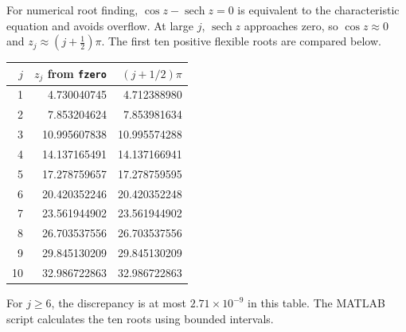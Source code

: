 For numerical root finding, $\cos z-\operatorname{sech}z=0$ is equivalent to the characteristic equation and avoids overflow. At large $j$, $\operatorname{sech}z$ approaches zero, so $\cos z\approx0$ and $z_j\approx(j+\tfrac12)\pi$. The first ten positive flexible roots are compared below.
\begin{center}
\begin{tabular}{rrr}\toprule
$j$ & $z_j$ from \texttt{fzero} & $(j+1/2)\pi$\\\midrule
1&4.730040745&4.712388980\\
2&7.853204624&7.853981634\\
3&10.995607838&10.995574288\\
4&14.137165491&14.137166941\\
5&17.278759657&17.278759595\\
6&20.420352246&20.420352248\\
7&23.561944902&23.561944902\\
8&26.703537556&26.703537556\\
9&29.845130209&29.845130209\\
10&32.986722863&32.986722863\\
\bottomrule\end{tabular}
\end{center}
For $j\ge 6$, the discrepancy is at most $2.71\times10^{-9}$ in this table. The MATLAB script calculates the ten roots using bounded intervals.

